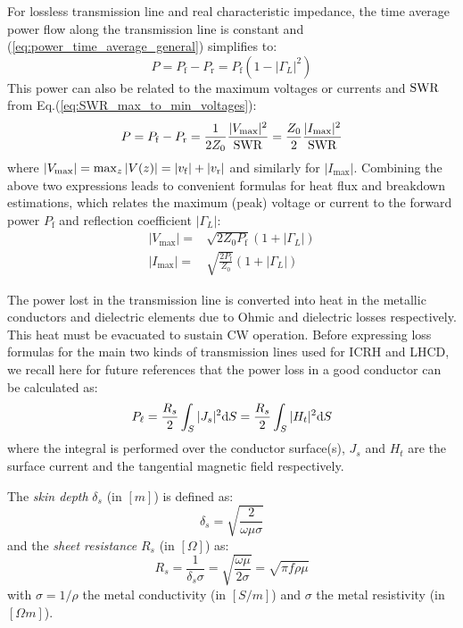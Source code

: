 For lossless transmission line and real characteristic impedance, the time average power flow along the transmission line is constant and (\ref{eq:power_time_average_general}) simplifies to:
\begin{equation}
P = P_\mathrm{f} - P_\mathrm{r} = P_\mathrm{f} \left(1 - |\Gamma_L|^2\right)
\label{eq:power_loss_lossless_transmission_line}
\end{equation}
This power can also be related to the maximum voltages or currents and ${\mathrm{SWR}}$ from Eq.(\ref{eq:SWR_max_to_min_voltages}):
\begin{equation}
P = P_\mathrm{f} - P_\mathrm{r} = \frac{1}{2 Z_0} \frac{	|V_{\mathrm{max}}|^2}{{\mathrm{SWR}}} = \frac{Z_0}{2} \frac{|I_{\mathrm{max}}|^2}{{\mathrm{SWR}}}
\label{eq:power_loss_lossless_transmission_line_maxvoltage_maxcurrent}
\end{equation}
where $|V_{\mathrm{max}}| = \max_z |V(z)| = |{v_{\mathrm{f}}}| + |{v_{\mathrm{r}}}|$ and similarly for $|I_\mathrm{max}|$. Combining the above two expressions leads to convenient formulas for heat flux and breakdown estimations, which relates the maximum (peak) voltage or current to the forward power $P_\mathrm{f}$ and reflection coefficient $|\Gamma_L|$:
\begin{subequations}
	\begin{align}
		|V_\mathrm{max}| =& \sqrt{2 Z_0 P_\mathrm{f} } \left(1 + |\Gamma_L| \right) \\
		|I_\mathrm{max}| =& \sqrt{\frac{2 P_\mathrm{f}}{Z_0} } \left(1 + |\Gamma_L| \right)
	\end{align}
	\label{eq:max_current_function_forward_power_gammaL}
\end{subequations}

The power lost in the transmission line is converted into heat in the metallic conductors and dielectric elements due to Ohmic and dielectric losses respectively. This heat must be evacuated to sustain CW operation. Before expressing loss formulas for the main two kinds of transmission lines used for ICRH and LHCD, we recall here for future references that the power loss in a good conductor can be calculated as:
\begin{equation}
P_\ell = \frac{R_s}{2} \int_S |J_s|^2 {\mathrm{d}} S = \frac{R_s}{2} \int_S |H_t|^2 {\mathrm{d}} S 
\label{eq:power_loss_conductor}
\end{equation}
where the integral is performed over the conductor surface(s), $J_s$ and $H_t$ are the surface current and the tangential magnetic field respectively\cite[§1.7]{pozar2012}. 

The \textit{skin depth} $\delta_s$ (in $[\si{m}]$) is defined as:
\begin{equation}
\delta_s 
	=
	\sqrt{\frac{2}{\omega \mu \sigma}}
	\label{eq:skin_depth}
\end{equation}
and the \textit{sheet resistance} $R_s$ (in $[\si{\Omega}]$) as:
\begin{equation}
R_s 
	= 
	\frac{1}{\delta_s \sigma}
	=
	\sqrt{\frac{\omega\mu}{2\sigma}}
	=
	\sqrt{\pi f \rho \mu }
	\label{eq:sheet_resistance}
\end{equation}
with $\sigma=1/\rho$ the metal conductivity (in $[\si{S/m}]$) and $\sigma$ the metal resistivity (in $[\si{\Omega m}]$). 

